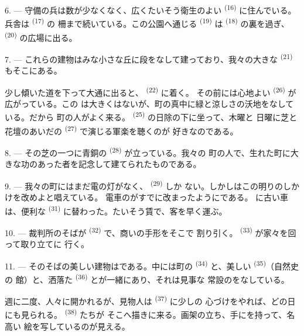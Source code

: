 6. --- 守備の兵は数が少なくなく、広くたいそう衛生のよい
\textsuperscript{(16)} に住んでいる。兵舎は \textsuperscript{(17)} の
柵まで続いている。この公園へ通じる \textsuperscript{(19)} は
 \textsuperscript{(18)} の裏を過ぎ、
\textsuperscript{(20)} の広場に出る。

7. --- これらの建物はみな小さな丘に段をなして建っており、我々の大きな
 \textsuperscript{(21)} もそこにある。

少し傾いた道を下って大通に出ると、 \textsuperscript{(22)} に着く。
その前には心地よい \textsuperscript{(26)} が広がっている。この
は大きくはないが、町の真中に緑と涼しさの沃地をなしている。だから
町の人がよく来る。 \textsuperscript{(25)} の日除の下に坐って、木曜と
日曜に芝と花壇のあいだの \textsuperscript{(27)} で演じる軍楽を聴くのが
好きなのである。

8. --- その芝の一つに青銅の \textsuperscript{(28)} が立っている。我々の
町の人で、生れた町に大きな功のあった者を記念して建てられたものである。

\VUsaut{4.0mm}
\VUsaut{3.4mm}

9. --- 我々の町にはまだ電の灯がなく、 \textsuperscript{(29)} しか
ない。しかしはこの明りのしかけを改めよと唱えている。
電車のがすでに改まったようにである。
に古い車は、便利な
\textsuperscript{(31)} に替わった。たいそう賃で、客を早く運ぶ。

10. --- 裁判所のそばが \textsuperscript{(32)} で、商いの手形をそこで
割り引く。 \textsuperscript{(33)} が家々を回って取り立てに
行く。

\VUsaut{4.0mm}
\VUsaut{3.4mm}

11. --- そのそばの美しい建物はである。中には町の
\textsuperscript{(34)} と、美しい \textsuperscript{(35)}（自然史の
館）と、洒落た \textsuperscript{(36)} とが一緒にあり、それは見事な
常設のをなしている。

週に二度、人々に開かれるが、見物人は \textsuperscript{(37)} に少しの
心づけをやれば、どの日にも見られる。 \textsuperscript{(38)} たちが
そこへ描きに来る。画架の立ち、手にを持って、名高い
絵を写しているのが見える。


